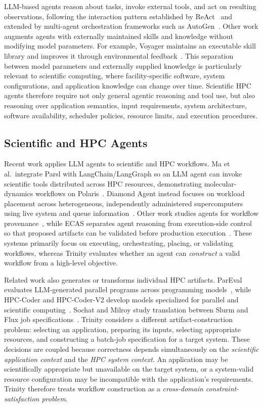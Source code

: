 \documentclass[conference]{IEEEtran}
\begin{document}
LLM-based agents reason about tasks, invoke external tools, and act on resulting observations, following the interaction pattern established by ReAct~\cite{yao2023react} and extended by multi-agent orchestration frameworks such as AutoGen~\cite{wu2024autogen}. Other work augments agents with externally maintained skills and knowledge without modifying model parameters. For example, Voyager maintains an executable skill library and improves it through environmental feedback~\cite{wang2023voyager}. This separation between model parameters and externally supplied knowledge is particularly relevant to scientific computing, where facility-specific software, system configurations, and application knowledge can change over time. Scientific HPC agents therefore require not only general agentic reasoning and tool use, but also reasoning over application semantics, input requirements, system architecture, software availability, scheduler policies, resource limits, and execution procedures.

\subsection{Scientific and HPC Agents}

Recent work applies LLM agents to scientific and HPC workflows. Ma et al.\ integrate Parsl with LangChain/LangGraph so an LLM agent can invoke scientific tools distributed across HPC resources, demonstrating molecular-dynamics workflows on Polaris~\cite{ma2025langchainparsl}. Diamond Agent instead focuses on workload placement across heterogeneous, independently administered supercomputers using live system and queue information~\cite{diamondagent2026}. Other work studies agents for workflow provenance~\cite{souza2025provenance}, while ECAS separates agent reasoning from execution-side control so that proposed artifacts can be validated before production execution~\cite{sun2026ecas}. These systems primarily focus on executing, orchestrating, placing, or validating workflows, whereas Trinity evaluates whether an agent can \textit{construct} a valid workflow from a high-level objective.

Related work also generates or transforms individual HPC artifacts. ParEval evaluates LLM-generated parallel programs across programming models~\cite{nichols2024pareval}, while HPC-Coder and HPC-Coder-V2 develop models specialized for parallel and scientific computing~\cite{nichols2024hpccoder,chaturvedi2025hpccoderv2}. Sochat and Milroy study translation between Slurm and Flux job specifications~\cite{sochat2026descriptive}. Trinity considers a different artifact-construction problem: selecting an application, preparing its inputs, selecting appropriate resources, and constructing a batch-job specification for a target system. These decisions are coupled because correctness depends simultaneously on the \textit{scientific application context} and the \textit{HPC system context}. An application may be scientifically appropriate but unavailable on the target system, or a system-valid resource configuration may be incompatible with the application's requirements. Trinity therefore treats workflow construction as a \textit{cross-domain constraint-satisfaction problem}.
\end{document}
